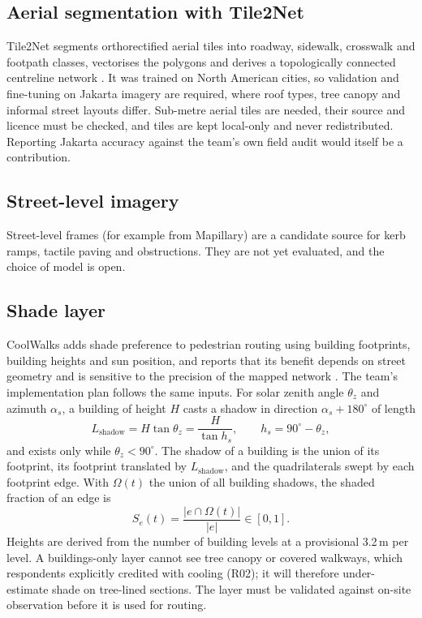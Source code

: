 \documentclass[11pt,a4paper]{article}
\begin{document}
\subsection{Aerial segmentation with Tile2Net}

Tile2Net segments orthorectified aerial tiles into roadway, sidewalk, crosswalk and footpath classes,
vectorises the polygons and derives a topologically connected centreline network \cite{tile2net2023}.
It was trained on North American cities, so validation and fine-tuning on Jakarta imagery are
required, where roof types, tree canopy and informal street layouts differ. Sub-metre aerial tiles
are needed, their source and licence must be checked, and tiles are kept local-only and never
redistributed. Reporting Jakarta accuracy against the team's own field audit would itself be a
contribution.

\subsection{Street-level imagery}

Street-level frames (for example from Mapillary) are a candidate source for kerb ramps, tactile
paving and obstructions. They are not yet evaluated, and the choice of model is open.

\subsection{Shade layer}\label{sec:shade}

CoolWalks adds shade preference to pedestrian routing using building footprints, building heights
and sun position, and reports that its benefit depends on street geometry and is sensitive to the
precision of the mapped network \cite{coolwalks2025}. The team's implementation plan follows the same
inputs. For solar zenith angle $\theta_z$ and azimuth $\alpha_s$, a building of height $H$ casts a
shadow in direction $\alpha_s+180^\circ$ of length
\begin{equation}
  L_{\mathrm{shadow}}=H\tan\theta_z=\frac{H}{\tan h_s},\qquad h_s=90^\circ-\theta_z,
  \label{eq:shadow}
\end{equation}
and exists only while $\theta_z<90^\circ$. The shadow of a building is the union of its footprint, its
footprint translated by $L_{\mathrm{shadow}}$, and the quadrilaterals swept by each footprint edge.
With $\Omega(t)$ the union of all building shadows, the shaded fraction of an edge is
\begin{equation}
  S_e(t)=\frac{\lvert e\cap\Omega(t)\rvert}{\lvert e\rvert}\in[0,1].
  \label{eq:shaded-fraction}
\end{equation}
Heights are derived from the number of building levels at a provisional 3.2\,m per level. A
buildings-only layer cannot see tree canopy or covered walkways, which respondents explicitly credited
with cooling (R02); it will therefore under-estimate shade on tree-lined sections. The layer must be
validated against on-site observation before it is used for routing.
\end{document}
